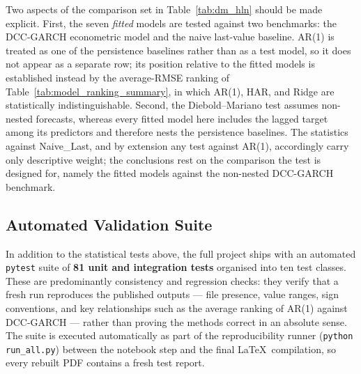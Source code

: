 Two aspects of the comparison set in Table~\ref{tab:dm_hln} should be made explicit.
First, the seven \emph{fitted} models are tested against two benchmarks: the DCC-GARCH
econometric model and the naive last-value baseline. AR(1) is treated as one of the
persistence baselines rather than as a test model, so it does not appear as a separate
row; its position relative to the fitted models is established instead by the
average-RMSE ranking of Table~\ref{tab:model_ranking_summary}, in which AR(1), HAR, and
Ridge are statistically indistinguishable. Second, the Diebold--Mariano test assumes
non-nested forecasts, whereas every fitted model here includes the lagged target among
its predictors and therefore nests the persistence baselines. The statistics against
Naive\_Last, and by extension any test against AR(1), accordingly carry only
descriptive weight; the conclusions rest on the comparison the test is designed for, namely the
fitted models against the non-nested DCC-GARCH benchmark.

\subsection{Automated Validation Suite}
\label{subsec:auto_tests}

In addition to the statistical tests above, the full project ships with an
automated \texttt{pytest} suite of \textbf{81 unit and integration tests}
organised into ten test classes. These are predominantly consistency and regression
checks: they verify that a fresh run reproduces the published outputs --- file presence,
value ranges, sign conventions, and key relationships such as the average ranking of
AR(1) against DCC-GARCH --- rather than proving the methods correct in an absolute sense.
The suite is executed automatically as part of the reproducibility runner
(\texttt{python run\_all.py}) between the notebook step and the final
\LaTeX\ compilation, so every rebuilt PDF contains a fresh test report.

